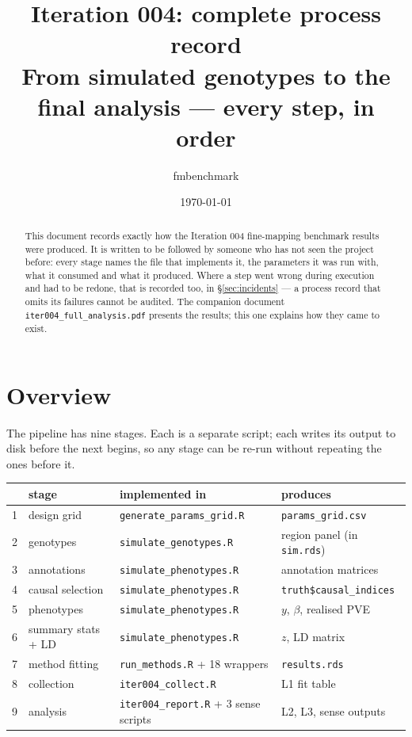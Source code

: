 \documentclass[11pt,a4paper]{article}
\title{\bf Iteration 004: complete process record\\[3pt]
\large From simulated genotypes to the final analysis --- every step, in order}
\author{fmbenchmark}\date{\today}
\newcommand{\file}[1]{\texttt{\small #1}}
\begin{document}
\maketitle

\begin{abstract}\noindent
This document records exactly how the Iteration 004 fine-mapping benchmark
results were produced. It is written to be followed by someone who has not seen
the project before: every stage names the file that implements it, the
parameters it was run with, what it consumed and what it produced. Where a step
went wrong during execution and had to be redone, that is recorded too, in
\S\ref{sec:incidents} --- a process record that omits its failures cannot be
audited. The companion document \file{iter004\_full\_analysis.pdf} presents the
results; this one explains how they came to exist.
\end{abstract}

\tableofcontents\bigskip

\section{Overview}

The pipeline has nine stages. Each is a separate script; each writes its output
to disk before the next begins, so any stage can be re-run without repeating the
ones before it.

\begin{center}\small
\begin{tabular}{rlll}\toprule
& stage & implemented in & produces\\\midrule
1 & design grid & \file{generate\_params\_grid.R} & \file{params\_grid.csv}\\
2 & genotypes & \file{simulate\_genotypes.R} & region panel (in \file{sim.rds})\\
3 & annotations & \file{simulate\_phenotypes.R} & annotation matrices\\
4 & causal selection & \file{simulate\_phenotypes.R} & \file{truth\$causal\_indices}\\
5 & phenotypes & \file{simulate\_phenotypes.R} & $y$, $\beta$, realised PVE\\
6 & summary stats + LD & \file{simulate\_phenotypes.R} & $z$, LD matrix\\
7 & method fitting & \file{run\_methods.R} + 18 wrappers & \file{results.rds}\\
8 & collection & \file{iter004\_collect.R} & L1 fit table\\
9 & analysis & \file{iter004\_report.R} + 3 sense scripts & L2, L3, sense outputs\\
\bottomrule\end{tabular}\end{center}
\end{document}
